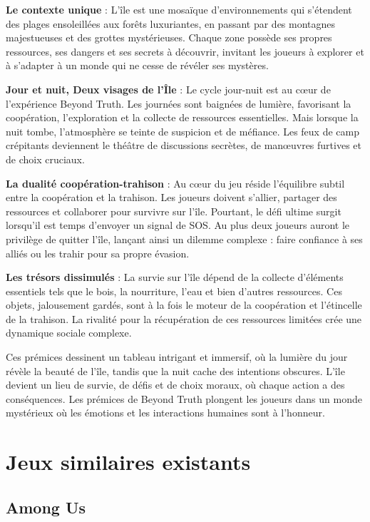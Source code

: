 \documentclass[
	article,			%
	11pt,				%
	oneside,			%
	a4paper,			%
	chapter=TITLE,
	french,			%
	sumario=tradicional
	]{base_nt}
\begin{document}
\textbf{Le contexte unique} : L'île est une mosaïque d'environnements qui s'étendent des plages ensoleillées aux forêts luxuriantes, en passant par des montagnes majestueuses et des grottes mystérieuses. Chaque zone possède ses propres ressources, ses dangers et ses secrets à découvrir, invitant les joueurs à explorer et à s'adapter à un monde qui ne cesse de révéler ses mystères.

\textbf{Jour et nuit, Deux visages de l'Île} : Le cycle jour-nuit est au cœur de l'expérience Beyond Truth. Les journées sont baignées de lumière, favorisant la coopération, l'exploration et la collecte de ressources essentielles. Mais lorsque la nuit tombe, l'atmosphère se teinte de suspicion et de méfiance. Les feux de camp crépitants deviennent le théâtre de discussions secrètes, de manœuvres furtives et de choix cruciaux.

\textbf{La dualité coopération-trahison} : Au cœur du jeu réside l'équilibre subtil entre la coopération et la trahison. Les joueurs doivent s'allier, partager des ressources et collaborer pour survivre sur l'île. Pourtant, le défi ultime surgit lorsqu'il est temps d'envoyer un signal de SOS. Au plus deux joueurs auront le privilège de quitter l'île, lançant ainsi un dilemme complexe : faire confiance à ses alliés ou les trahir pour sa propre évasion.

\textbf{Les trésors dissimulés} : La survie sur l'île dépend de la collecte d'éléments essentiels tels que le bois, la nourriture, l'eau et bien d'autres ressources. Ces objets, jalousement gardés, sont à la fois le moteur de la coopération et l'étincelle de la trahison. La rivalité pour la récupération de ces ressources limitées crée une dynamique sociale complexe.

\newpage Ces prémices dessinent un tableau intrigant et immersif, où la lumière du jour révèle la beauté de l'île, tandis que la nuit cache des intentions obscures. L'île devient un lieu de survie, de défis et de choix moraux, où chaque action a des conséquences. Les prémices de Beyond Truth plongent les joueurs dans un monde mystérieux où les émotions et les interactions humaines sont à l'honneur.

\section{Jeux similaires existants}

\subsection{Among Us}
\end{document}
